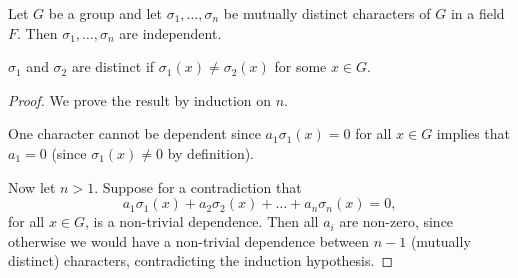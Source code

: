 \begin{theorem}\label{thm:12}
	Let $G$ be a group and let $\sigma_1, \dots, \sigma_n$ be mutually distinct characters of $G$ in a field $F$. Then $\sigma_1, \dots, \sigma_n$ are independent.
	\begin{note}
		$\sigma_1$ and $\sigma_2$ are distinct if $\sigma_1(x) \neq \sigma_2(x)$ for some $x \in G$.
	\end{note}
	\begin{proof}
		We prove the result by induction on $n$.
		
		One character cannot be dependent since $a_1 \sigma_1(x) = 0$ for all $x \in G$ implies that $a_1 = 0$ (since $\sigma_1(x) \neq 0$ by definition).
		
		Now let $n > 1$. Suppose for a contradiction that
		\begin{equation}\label{eq:thm-12-non-trivial-dependence}
			a_1 \sigma_1(x) + a_2 \sigma_2(x) + \dots + a_n \sigma_n(x) = 0,
		\end{equation}
		for all $x \in G$, is a non-trivial dependence. Then all $a_i$ are non-zero, since otherwise we would have a non-trivial dependence between $n - 1$ (mutually distinct) characters, contradicting the induction hypothesis.
		

\end{proof}
\end{theorem}
